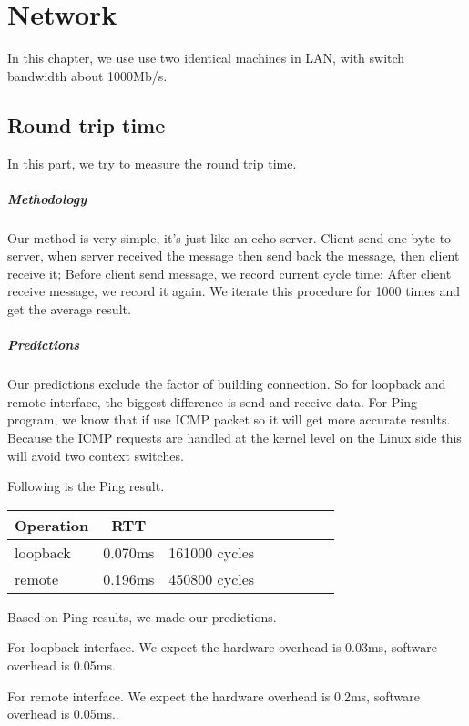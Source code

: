 \chapter{Network}
In this chapter, we use use two identical machines in LAN, with switch bandwidth about 1000Mb/s.

\section{Round trip time}
In this part, we try to measure the round trip time.

\paragraph{Methodology}
Our method is very simple, it's just like an echo server. Client send one byte to server, when server received the message then send back the message, then client receive it;
Before client send message, we record current cycle time; After client receive message, we record it again. We iterate this procedure for 1000 times and get the average result.


\paragraph{Predictions}
Our predictions exclude the factor of building connection. So for loopback and remote interface, the biggest difference is send and receive data.
For Ping program, we know that if use ICMP packet so it will get more accurate results. Because the ICMP requests are handled at the kernel level on the Linux side this will avoid two context switches.

Following is the Ping result.
\begin{center}
\begin{tabular}{l*{6}{c}r}
Operation       &  RTT \\
\hline
loopback & 0.070ms & 161000 cycles\\
remote & 0.196ms &  450800 cycles\\
\end{tabular}
\end{center}

Based on Ping results, we made our predictions.

For loopback interface. We expect the hardware overhead is 0.03ms, software overhead is 0.05ms.

For remote interface. We expect the hardware overhead is 0.2ms, software overhead is 0.05ms..

